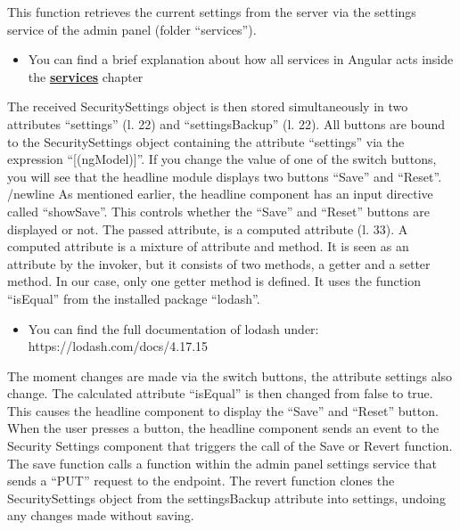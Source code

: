 This function retrieves the current settings from the server via the settings service of the admin panel (folder \enquote{services}).
\begin{itemize}
    \item You can find a brief explanation about how all services in Angular acts inside the \hyperref[subsec:services]{\textbf{services}} chapter
\end{itemize}
The received SecuritySettings object is then stored simultaneously in two attributes \enquote{settings} (l. 22) and \enquote{settingsBackup} (l. 22).
All buttons are bound to the SecuritySettings object containing the attribute \enquote{settings} via the expression \enquote{[(ngModel)]}.
If you change the value of one of the switch buttons, you will see that the headline module displays two buttons \enquote{Save} and \enquote{Reset}. /newline As mentioned earlier, the headline component has an input directive called \enquote{showSave}. This controls whether the \enquote{Save} and \enquote{Reset} buttons are displayed or not. The passed attribute, is a computed attribute (l. 33). A computed attribute is a mixture of attribute and method. It is seen as an attribute by the invoker, but it consists of two methods, a getter and a setter method. In our case, only one getter method is defined.
It uses the function \enquote{isEqual} from the installed package \enquote{lodash}.
\begin{itemize}
    \item You can find the full documentation of lodash under: https://lodash.com/docs/4.17.15
\end{itemize}
The moment changes are made via the switch buttons, the attribute settings also change. The calculated attribute \enquote{isEqual} is then changed from false to true. This causes the headline component to display the \enquote{Save} and \enquote{Reset} button. When the user presses a button, the headline component sends an event to the Security Settings component that triggers the call of the Save or Revert function. \\
The save function calls a function within the admin panel settings service that sends a \enquote{PUT} request to the endpoint.
The revert function clones the SecuritySettings object from the settingsBackup attribute into settings, undoing any changes made without saving.

